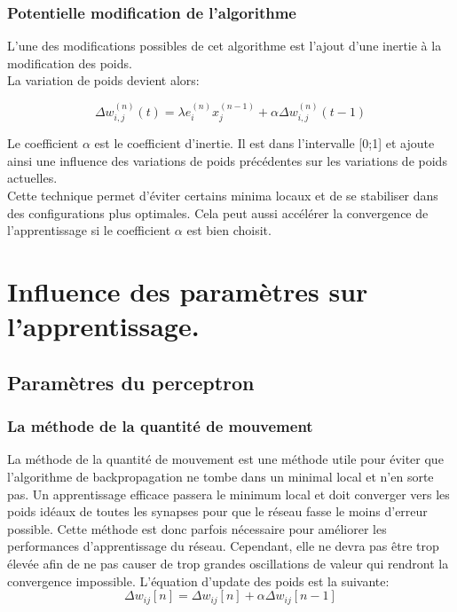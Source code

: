 \documentclass[a4paper,oneside]{report}
\begin{document}
                \subsection{Potentielle modification de l'algorithme}

                    L'une des modifications possibles de cet algorithme est l'ajout d'une inertie à la modification des poids.\\

                    La variation de poids devient alors:

                    \begin{equation}
                        \Delta w_{i,j}^{(n)}(t) = \lambda e_{i}^{(n)}x_{j}^{(n-1)} + \alpha \Delta w_{i,j}^{(n)}(t-1)
                    \end{equation}

                    Le coefficient $\alpha$ est le coefficient d'inertie. Il est dans l'intervalle [0;1] et ajoute ainsi une influence des variations de poids précédentes sur les variations de poids actuelles.\\

                    Cette technique permet d'éviter certains minima locaux et de se stabiliser dans des configurations plus optimales. Cela peut aussi accélérer la convergence de l'apprentissage si le coefficient $\alpha$ est bien choisit.


        \chapter{Influence des paramètres sur l'apprentissage.}


\section{Paramètres du perceptron}

\subsection{La méthode de la quantité de mouvement}
La méthode de la quantité de mouvement est une méthode utile pour éviter que l'algorithme de backpropagation ne tombe dans un minimal local et n'en sorte pas. Un apprentissage efficace passera le minimum local et doit converger vers les poids idéaux de toutes les synapses pour que le réseau fasse le moins d'erreur possible. Cette méthode est donc parfois nécessaire pour améliorer les performances d'apprentissage du réseau. Cependant, elle ne devra pas être trop élevée afin de ne pas causer de trop grandes oscillations de valeur qui rendront la convergence impossible.
L'équation d'update des poids est la suivante:
\begin{equation}
\Delta w_{ij}[n]= \Delta w_{ij}[n]+ \alpha \Delta w_{ij}[n-1]
\end{equation}
\end{document}
